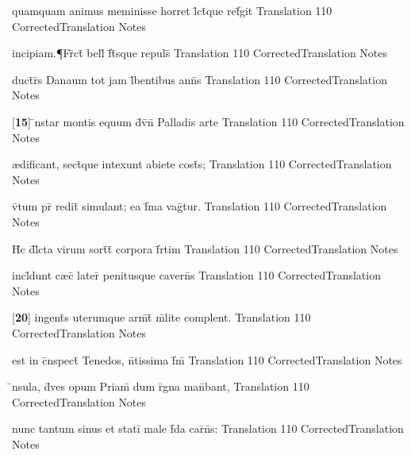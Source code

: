 \latline
  {quamquam animus meminisse horret l\={}ct\={}que ref\={}git}
  { Translation }
  {110}
  { CorrectedTranslation }
  { Notes }


\latline
  {incipiam.{\P}Fr\={}ct\={\macron {\i}} bell\={} f\={}t\={\macron {\i}}sque repuls\={\macron {\i}}}
  { Translation }
  {110}
  { CorrectedTranslation }
  { Notes }


\latline
  {duct\={}r\={}s Danaum tot jam l\={}bentibus ann\={\macron {\i}}s}
  { Translation }
  {110}
  { CorrectedTranslation }
  { Notes }


\latline
  {[\textbf{15}] \={\macron {\i}}nstar montis equum d\={\macron {\i}}v\={\macron {\i}}n\={} Palladis arte}
  { Translation }
  {110}
  { CorrectedTranslation }
  { Notes }


\latline
  {{\ae}dificant, sect\={}que intexunt abiete cost\={}s;}
  { Translation }
  {110}
  { CorrectedTranslation }
  { Notes }


\latline
  {v\={}tum pr\={} redit\={} simulant; ea f\={}ma vag\={}tur.}
  { Translation }
  {110}
  { CorrectedTranslation }
  { Notes }


\latline
  {H\={}c d\={}l\={}cta virum sort\={\macron {\i}}t\={\macron {\i}} corpora f\={}rtim}
  { Translation }
  {110}
  { CorrectedTranslation }
  { Notes }


\latline
  {incl\={}dunt c{\ae}c\={} later\={\macron {\i}} penitusque cavern\={}s}
  { Translation }
  {110}
  { CorrectedTranslation }
  { Notes }


\latline
  {[\textbf{20}] ingent\={\macron {\i}}s uterumque arm\={}t\={} m\={\macron {\i}}lite complent.}
  { Translation }
  {110}
  { CorrectedTranslation }
  { Notes }


\latline
  {est in c\={}nspect\={} Tenedos, n\={}tissima f\={}m\={}}
  { Translation }
  {110}
  { CorrectedTranslation }
  { Notes }


\latline
  {\={\macron {\i}}nsula, d\={\macron {\i}}ves opum Priam\={\macron {\i}} dum r\={}gna man\={}bant,}
  { Translation }
  {110}
  { CorrectedTranslation }
  { Notes }


\latline
  {nunc tantum sinus et stati\={} male f\={\macron {\i}}da car\={\macron {\i}}n\={\macron {\i}}s:}
  { Translation }
  {110}
  { CorrectedTranslation }
  { Notes }


